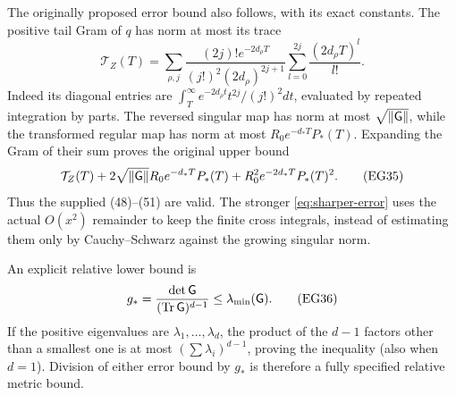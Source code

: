 \documentclass[11pt]{article}
\begin{document}
The originally proposed error bound also follows, with its exact
constants. The positive tail Gram of $q$ has norm at most its trace
\[
 \mathcal T_Z(T)=\sum_{\rho,j}
 \frac{(2j)!e^{-2d_\rho T}}{(j!)^2(2d_\rho)^{2j+1}}
              \sum_{l=0}^{2j}\frac{(2d_\rho T)^l}{l!}.
 \tag{EG34}\label{eq:old-tail}
\]
Indeed its diagonal entries are
$\int_T^\infty e^{-2d_\rho t}t^{2j}/(j!)^2dt$, evaluated by repeated
integration by parts. The reversed singular map has norm at most
$\sqrt{\|\mathsf G\|}$, while the transformed regular map has norm at most
$R_0e^{-d_*T}P_*(T)$. Expanding the Gram of their sum proves the
original upper bound
\[
 \mathcal T_Z(T)+2\sqrt{\|\mathsf G\|}R_0e^{-d_*T}P_*(T)
                      +R_0^2e^{-2d_*T}P_*(T)^2.
 \tag{EG35}\label{eq:old-error}
\]
Thus the supplied (48)--(51) are valid. The stronger
\eqref{eq:sharper-error} uses the actual $O(x^2)$ remainder to keep
the finite cross integrals, instead of estimating them only by
Cauchy--Schwarz against the growing singular norm.

An explicit relative lower bound is
\[
 g_* =\frac{\det\mathsf G}{(\operatorname{Tr}\mathsf G)^{d-1}}\le\lambda_{\min}(\mathsf G).
 \tag{EG36}\label{eq:gstar}
\]
If the positive eigenvalues are $\lambda_1,\ldots,\lambda_d$, the
product of the $d-1$ factors other than a smallest one is at most
$(\sum\lambda_i)^{d-1}$, proving the inequality (also when $d=1$).
Division of either error bound by $g_*$ is therefore a fully
specified relative metric bound.
\end{document}
